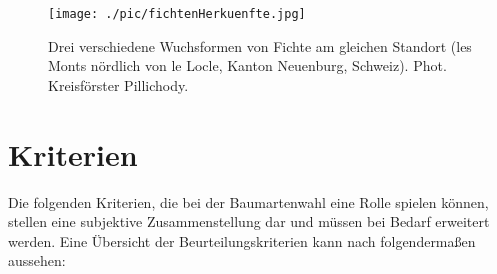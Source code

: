 \documentclass[twocolumn]{scrartcl}
\begin{document}
\begin{figure}[htbp]
  \centering
  \texttt{[image: ./pic/fichtenHerkuenfte.jpg]}
  \caption{Drei verschiedene Wuchsformen von Fichte am gleichen
    Standort (les Monts nördlich von le Locle, Kanton Neuenburg,
    Schweiz). Phot. Kreisförster
    Pillichody. \citep[S.~86]{hegi1906IllustrierteFloraBd1}}
  \label{fig:fichtenHerkuenfte}
\end{figure}

\section{Kriterien}
\label{sec:kriterien}

Die folgenden Kriterien, die bei der Baumartenwahl eine Rolle spielen
können, stellen eine subjektive Zusammenstellung dar und müssen bei
Bedarf erweitert werden. Eine Übersicht der Beurteilungskriterien kann
nach \citet[Bd.1, S.108]{bauer1962WaldbauAlsWissenschaft}
folgendermaßen aussehen:
\end{document}
